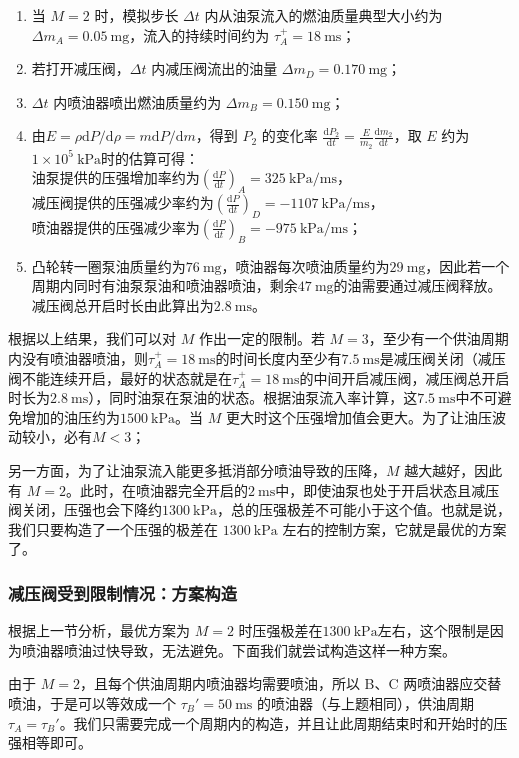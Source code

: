 \documentclass[withoutpreface,bwprint]{cumcmthesis}
\newcommand{\prb}{\times 10^5~\mathrm{kPa}}
\newcommand{\pre}{~\mathrm{kPa}}
\newcommand{\tim}{~\mathrm{ms}}
\newcommand{\mas}{~\mathrm{mg}}
\begin{document}
\begin{enumerate}
	\item 当 $M=2$ 时，模拟步长 $\Delta t$ 内从油泵流入的燃油质量典型大小约为 $\Delta m_A=0.05\mas$，流入的持续时间约为 $\tau_A^+=18\tim$；
	\item 若打开减压阀，$\Delta t$ 内减压阀流出的油量 $\Delta m_D=0.170\mas$；
	\item $\Delta t$ 内喷油器喷出燃油质量约为 $\Delta m_B=0.150\mas$；
	\item 由$E=\rho\mathrm dP/\mathrm d\rho=m\mathrm dP/\mathrm dm$，得到 $P_2$ 的变化率 $\frac{\mathrm dP_2}{\mathrm dt}=\frac{E}{m_2}\frac{\mathrm dm_2}{\mathrm dt}$，取 $E$ 约为 $1\prb$时的估算可得：
	\\油泵提供的压强增加率约为$(\frac{\mathrm dP}{\mathrm dt})_A=325~\mathrm{kPa/ms}$，
	\\减压阀提供的压强减少率约为$(\frac{\mathrm dP}{\mathrm dt})_D=-1107~\mathrm{kPa/ms}$，
	\\喷油器提供的压强减少率为$(\frac{\mathrm dP}{\mathrm dt})_B=-975~\mathrm{kPa/ms}$；
	\item 凸轮转一圈泵油质量约为$76\mas$，喷油器每次喷油质量约为$29\mas$，因此若一个周期内同时有油泵泵油和喷油器喷油，剩余$47\mas$的油需要通过减压阀释放。减压阀总开启时长由此算出为$2.8\tim$。
\end{enumerate}

根据以上结果，我们可以对 $M$ 作出一定的限制。若 $M=3$，至少有一个供油周期内没有喷油器喷油，则$\tau_A^+=18\tim$的时间长度内至少有$7.5\tim$是减压阀关闭（减压阀不能连续开启，最好的状态就是在$\tau_A^+=18\tim$的中间开启减压阀，减压阀总开启时长为$2.8\tim$），同时油泵在泵油的状态。根据油泵流入率计算，这$7.5\tim$中不可避免增加的油压约为$1500\pre$。当 $M$ 更大时这个压强增加值会更大。为了让油压波动较小，必有$M<3$；

另一方面，为了让油泵流入能更多抵消部分喷油导致的压降，$M$ 越大越好，因此有 $M=2$。此时，在喷油器完全开启的$2\tim$中，即使油泵也处于开启状态且减压阀关闭，压强也会下降约$1300\pre$，总的压强极差不可能小于这个值。也就是说，我们只要构造了一个压强的极差在 $1300\pre$ 左右的控制方案，它就是最优的方案了。

\subsubsection{减压阀受到限制情况：方案构造}
根据上一节分析，最优方案为 $M=2$ 时压强极差在$1300\pre$左右，这个限制是因为喷油器喷油过快导致，无法避免。下面我们就尝试构造这样一种方案。

由于 $M=2$，且每个供油周期内喷油器均需要喷油，所以 B、C 两喷油器应交替喷油，于是可以等效成一个 $\tau_B'=50\tim$ 的喷油器（与上题相同），供油周期 $\tau_A=\tau_B'$。我们只需要完成一个周期内的构造，并且让此周期结束时和开始时的压强相等即可。
\end{document}
